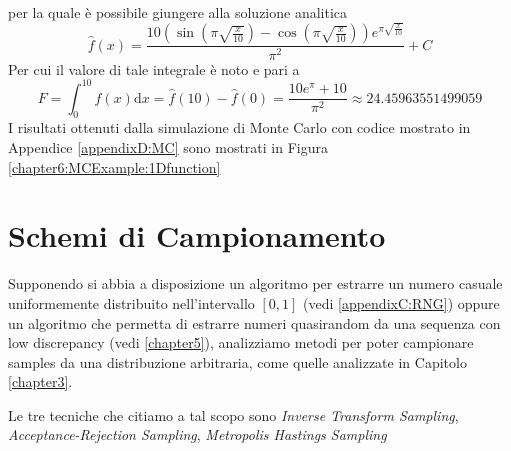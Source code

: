 per la quale \`e possibile giungere alla soluzione analitica
\begin{equation}
	\hat{f}(x)=
		\frac{10\left(\sin\left(\pi\sqrt{\frac{x}{10}}\right)−\cos\left(\pi\sqrt{\frac{x}{10}}\right)\right)e^{\pi\sqrt{\frac{x}{10}}}}{\pi^2} + C
\end{equation}
Per cui il valore di tale integrale \`e noto e pari a 
\begin{equation}
	F = \int_0^{10}f(x)\mathrm{d}x = \hat{f}(10) - \hat{f}(0) = \frac{10e^\pi+10}{\pi^2}\approx 24.45963551499059
\end{equation}
I risultati ottenuti dalla simulazione di Monte Carlo con codice mostrato in Appendice \ref{appendixD:MC} sono mostrati in Figura 
\ref{chapter6:MCExample:1Dfunction}
\section{Schemi di Campionamento}
Supponendo si abbia a disposizione un algoritmo per estrarre un numero casuale uniformemente distribuito nell'intervallo $[0,1]$ 
(vedi \ref{appendixC:RNG}) oppure un algoritmo che permetta di estrarre numeri quasirandom da una sequenza con low discrepancy (vedi \ref{chapter5}),
analizziamo metodi per poter campionare samples da una distribuzione arbitraria, come quelle analizzate in Capitolo \ref{chapter3}.\par
Le tre tecniche che citiamo a tal scopo sono \textit{Inverse Transform Sampling}, \textit{Acceptance-Rejection Sampling}, 
\textit{Metropolis Hastings Sampling}
